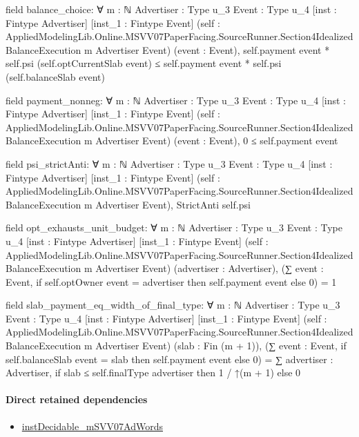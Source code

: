 \documentclass[10pt]{article}
\begin{document}
\begin{ReviewVerbatim}
field balance_choice:
∀ {m : ℕ} {Advertiser : Type u_3} {Event : Type u_4} [inst : Fintype Advertiser] [inst_1 : Fintype Event]
  (self : AppliedModelingLib.Online.MSVV07PaperFacing.SourceRunner.Section4IdealizedBalanceExecution m Advertiser Event)
  (event : Event),
  self.payment event * self.psi (self.optCurrentSlab event) ≤ self.payment event * self.psi (self.balanceSlab event)

field payment_nonneg:
∀ {m : ℕ} {Advertiser : Type u_3} {Event : Type u_4} [inst : Fintype Advertiser] [inst_1 : Fintype Event]
  (self : AppliedModelingLib.Online.MSVV07PaperFacing.SourceRunner.Section4IdealizedBalanceExecution m Advertiser Event)
  (event : Event), 0 ≤ self.payment event

field psi_strictAnti:
∀ {m : ℕ} {Advertiser : Type u_3} {Event : Type u_4} [inst : Fintype Advertiser] [inst_1 : Fintype Event]
  (self :
    AppliedModelingLib.Online.MSVV07PaperFacing.SourceRunner.Section4IdealizedBalanceExecution m Advertiser Event),
  StrictAnti self.psi

field opt_exhausts_unit_budget:
∀ {m : ℕ} {Advertiser : Type u_3} {Event : Type u_4} [inst : Fintype Advertiser] [inst_1 : Fintype Event]
  (self : AppliedModelingLib.Online.MSVV07PaperFacing.SourceRunner.Section4IdealizedBalanceExecution m Advertiser Event)
  (advertiser : Advertiser), (∑ event : Event, if self.optOwner event = advertiser then self.payment event else 0) = 1

field slab_payment_eq_width_of_final_type:
∀ {m : ℕ} {Advertiser : Type u_3} {Event : Type u_4} [inst : Fintype Advertiser] [inst_1 : Fintype Event]
  (self : AppliedModelingLib.Online.MSVV07PaperFacing.SourceRunner.Section4IdealizedBalanceExecution m Advertiser Event)
  (slab : Fin (m + 1)),
  (∑ event : Event, if self.balanceSlab event = slab then self.payment event else 0) =
    ∑ advertiser : Advertiser, if slab ≤ self.finalType advertiser then 1 / ↑(m + 1) else 0
\end{ReviewVerbatim}

\paragraph{Direct retained dependencies}
\begin{itemize}\raggedright
\item \hyperlink{governing-declaration-9d9905573bef867c}{inst\allowbreak{}Decidable\_\allowbreak{}m\allowbreak{}SVV07\allowbreak{}Ad\allowbreak{}Words}
\end{itemize}
\hypertarget{governing-declaration-251e5be7cd7b9364}{}
\end{document}
